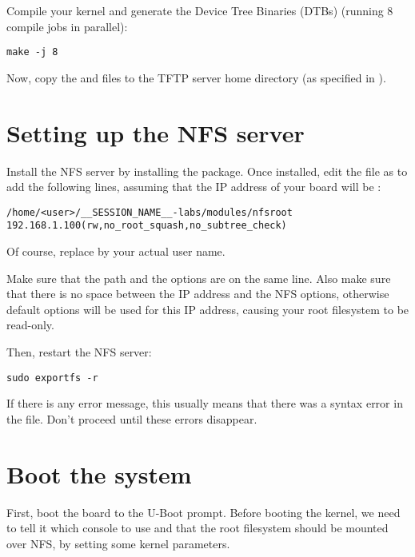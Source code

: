 Compile your kernel and generate the Device Tree Binaries (DTBs)
(running 8 compile jobs in parallel):

\begin{verbatim}
make -j 8
\end{verbatim}

Now, copy the  and  files to the
TFTP server home directory (as specified in ).

\section{Setting up the NFS server}

Install the NFS server by installing the 
package. Once installed, edit the  file as
 to add the following lines, assuming that the IP address
of your board will be :

\scriptsize
\begin{verbatim}
/home/<user>/__SESSION_NAME__-labs/modules/nfsroot 192.168.1.100(rw,no_root_squash,no_subtree_check)
\end{verbatim}
\normalsize

Of course, replace  by your actual user name.

Make sure that the path and the options are on the same line.
Also make sure that there is no space between the IP address and the NFS
options, otherwise default options will be used for this IP address,
causing your root filesystem to be read-only.

Then, restart the NFS server:

\begin{verbatim}
sudo exportfs -r
\end{verbatim}

If there is any error message, this usually means that there was a
syntax error in the  file. Don't proceed until these
errors disappear.

\section{Boot the system}

First, boot the board to the U-Boot prompt. Before booting the kernel,
we need to tell it which console to use and that the root filesystem
should be mounted over NFS, by setting some kernel parameters.

